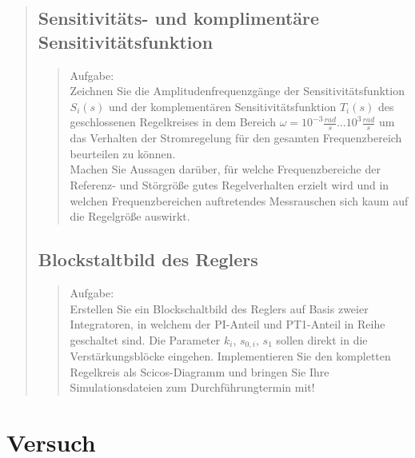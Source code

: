 \begin{quote}
\begin{quote}
	 	
    \end{quote}    
    
    
    
    \subsection{Sensitivitäts- und komplimentäre Sensitivitätsfunktion}
    \begin{quote}
        Aufgabe:\\
        Zeichnen Sie die Amplitudenfrequenzgänge der Sensitivitätsfunktion $S_i(s)$ und der komplementären
        Sensitivitätsfunktion $T_i (s)$ des geschlossenen Regelkreises in dem Bereich $\omega = 10^{-3}\frac{rad}{s}
        \ldots 10^{3}\frac{rad}{s}$ um das Verhalten der Stromregelung für den gesamten Frequenzbereich beurteilen zu
        können.\\
        Machen Sie Aussagen darüber, für welche Frequenzbereiche der Referenz- und Störgröße gutes Regelverhalten
        erzielt wird und in welchen Frequenzbereichen auftretendes Messrauschen sich kaum auf die Regelgröße auswirkt.\\
        
                        
	\end{quote}
		
	\subsection{Blockstaltbild des Reglers}
    \begin{quote}
        Aufgabe:\\
        Erstellen Sie ein Blockschaltbild des Reglers auf Basis zweier Integratoren, in welchem der PI-Anteil und PT1-Anteil in Reihe geschaltet
        sind. Die Parameter $k_i$, $s_{0,i}$, $s_1$ sollen direkt in die Verstärkungsblöcke eingehen. Implementieren Sie
        den kompletten Regelkreis als Scicos-Diagramm und bringen Sie Ihre Simulationsdateien zum Durchführungtermin
        mit!
        
	 	
    \end{quote}
    
  
\end{quote}


\section{Versuch}
\begin{quote}
    
\end{quote}


